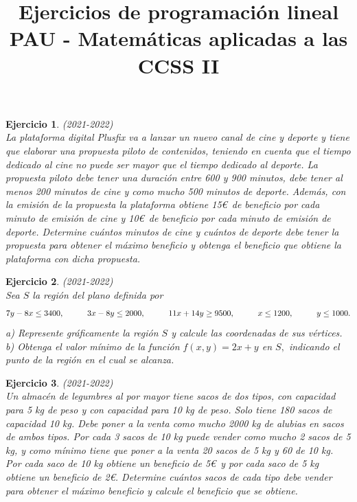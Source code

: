 \documentclass[12pt, a4paper]{amsart}
\newtheorem{ejer}{Ejercicio}
\begin{document}
\title{Ejercicios de programación lineal PAU - Matemáticas aplicadas a las CCSS II}
\maketitle
\date{}
\thispagestyle{empty}

\begin{ejer}\em (2021-2022)\\
La plataforma digital Plusfix va a lanzar un nuevo canal de cine y deporte y tiene que elaborar una propuesta piloto de contenidos, teniendo en cuenta que el tiempo dedicado al cine no puede ser mayor que el tiempo dedicado al deporte. La propuesta piloto debe tener una duración entre 600 y 900 minutos, debe tener al menos 200 minutos de cine y como mucho 500 minutos de deporte. Además, con la emisión de la propuesta la plataforma obtiene 15\euro\ de beneficio por cada minuto de emisión de cine y 10\euro\ de beneficio por cada minuto de emisión de deporte. Determine cuántos minutos de cine y cuántos de deporte debe tener la propuesta para obtener el máximo beneficio y obtenga el beneficio que obtiene la plataforma con dicha propuesta.
\end{ejer}

\begin{ejer}\em (2021-2022)\\
Sea $S$ la región del plano definida por
\[7y - 8x\leq 3400,\hspace*{1cm} 3x-8y\leq 2000,\hspace*{1cm} 11x+14y\geq 9500,\hspace*{1cm} x\leq 1200,\hspace*{1cm} y\leq 1000.\]
a) Represente gráficamente la región $S$ y calcule las coordenadas de sus vértices.\\
b) Obtenga el valor mínimo de la función $f(x, y) = 2x + y$ en $S,$ indicando el punto de la región en el cual se alcanza.
\end{ejer}

\begin{ejer}\em (2021-2022)\\
Un almacén de legumbres al por mayor tiene sacos de dos tipos, con capacidad para 5 kg de peso y con capacidad para 10 kg de peso. Solo tiene 180 sacos de capacidad 10 kg. Debe poner a la venta como mucho 2000 kg de alubias en sacos de ambos tipos. Por cada 3 sacos de 10 kg puede vender como mucho 2 sacos de 5 kg, y como mínimo tiene que poner a la venta 20 sacos de 5 kg y 60 de 10 kg. Por cada saco de 10 kg obtiene un beneficio de 5\euro\ y por cada saco de 5 kg obtiene un beneficio de 2\euro. Determine cuántos sacos de cada tipo debe vender para obtener el máximo beneficio y calcule el beneficio que se obtiene.
\end{ejer}
\end{document}
